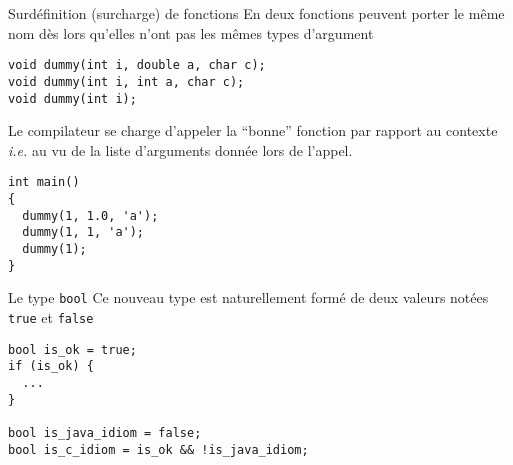 \documentclass[c]{beamer}
\begin{document}
\begin{frame}[fragile]{Surdéfinition (surcharge) de fonctions}
 En \Cpp deux fonctions peuvent porter le même nom dès lors qu'elles n'ont pas
les mêmes types d'argument

\begin{verbatim}
void dummy(int i, double a, char c);
void dummy(int i, int a, char c);
void dummy(int i);
\end{verbatim}

\pause
Le compilateur se charge d'appeler la ``bonne'' fonction par rapport au contexte
\emph{i.e.} au vu de la liste d'arguments donnée lors de l'appel.

\begin{verbatim}
int main()
{
  dummy(1, 1.0, 'a');
  dummy(1, 1, 'a');
  dummy(1);
}
\end{verbatim}
\end{frame}


\begin{comment}
\begin{frame}[fragile]{Fonction \texttt{inline}}
 \structure{Les fonctions en ligne} remplacent (avantageusement) les macros utilisées en C
tout en conservant un temps d'exécution plus court

\vskip +10pt
On remplacera ainsi la déclaration en C
\begin{verbatim}
// Macro en C
#define CARRE(x) ((x) * (x))
\end{verbatim}
par
\begin{verbatim}
// Fonction en ligne en C++
inline double carre(const double x) { return x*x; }
\end{verbatim}
\end{frame}
\end{comment}

\begin{frame}[fragile]{Le type \texttt{bool}}
Ce nouveau type est naturellement formé de deux valeurs notées \texttt{true} et \texttt{false}

\begin{verbatim}
bool is_ok = true;
if (is_ok) {
  ...
}

bool is_java_idiom = false;
bool is_c_idiom = is_ok && !is_java_idiom;
\end{verbatim}
\end{frame}
\end{document}
